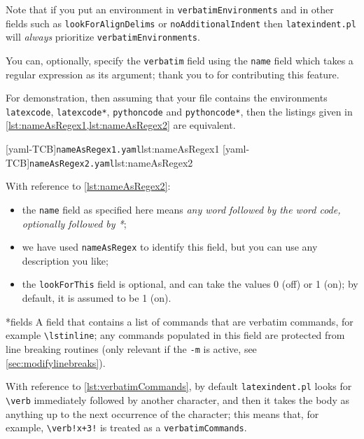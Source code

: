 \documentclass[10pt]{article}
\begin{document}
 Note that if you put an environment in \texttt{verbatimEnvironments} and in other fields
 such as \texttt{lookForAlignDelims} or \texttt{noAdditionalIndent} then
 \texttt{latexindent.pl} will \emph{always} prioritize \texttt{verbatimEnvironments}.

 You can, optionally, specify  the
 \texttt{verbatim} field using the \texttt{name} field which takes a regular expression
 as its argument; thank you to \cite{XuehaiPan} for contributing this feature.

 \begin{example}
 For demonstration, then assuming that your file contains the environments
 \texttt{latexcode}, \texttt{latexcode*}, \texttt{pythoncode} and \texttt{pythoncode*},
 then the listings given in \cref{lst:nameAsRegex1,lst:nameAsRegex2} are equivalent.

 \begin{cmhtcbraster}[raster column skip=.1\linewidth]
  [yaml-TCB]{\texttt{nameAsRegex1.yaml}}{lst:nameAsRegex1}
  [yaml-TCB]{\texttt{nameAsRegex2.yaml}}{lst:nameAsRegex2}
 \end{cmhtcbraster}

 With reference to \cref{lst:nameAsRegex2}:
 \begin{itemize}
  \item the \texttt{name} field as specified here means \emph{any word followed by the
        word code, optionally followed by *};
  \item we have used \texttt{nameAsRegex} to identify this field, but you can use any
        description you like;
  \item the \texttt{lookForThis} field is optional, and can take the values 0 (off) or 1
        (on); by default, it is assumed to be 1 (on).
 \end{itemize}
 \end{example}

*{fields}
 A field that contains a list of commands that are verbatim commands, for example
 \lstinline|\lstinline|; any commands populated in this field are protected from line
 breaking routines (only relevant if the \texttt{-m} is active, see
 \vref{sec:modifylinebreaks}).

 With reference to \cref{lst:verbatimCommands}, by default \texttt{latexindent.pl} looks
 for \lstinline|\verb| immediately followed by another character, and then it takes the
 body as anything up to the next occurrence of the character; this means that, for
 example, \lstinline|\verb!x+3!| is treated as a \texttt{verbatimCommands}.
\end{document}
